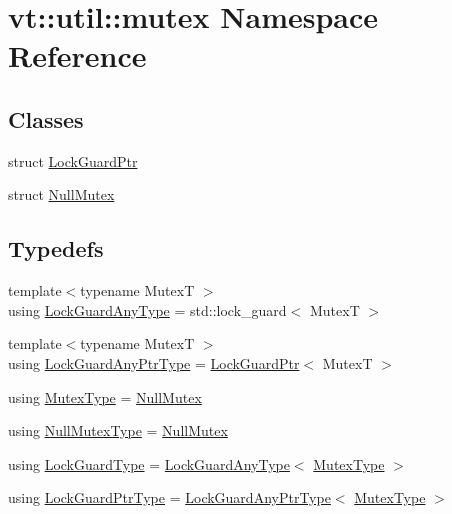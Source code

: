\hypertarget{namespacevt_1_1util_1_1mutex}{}\section{vt\+:\+:util\+:\+:mutex Namespace Reference}
\label{namespacevt_1_1util_1_1mutex}
\subsection*{Classes}
\begin{DoxyCompactItemize}
\item 
struct \hyperlink{structvt_1_1util_1_1mutex_1_1_lock_guard_ptr}{Lock\+Guard\+Ptr}
\item 
struct \hyperlink{structvt_1_1util_1_1mutex_1_1_null_mutex}{Null\+Mutex}
\end{DoxyCompactItemize}
\subsection*{Typedefs}
\begin{DoxyCompactItemize}
\item 
{\footnotesize template$<$typename MutexT $>$ }\\using \hyperlink{namespacevt_1_1util_1_1mutex_ae88ee37c8846b0738a5137f96f912394}{Lock\+Guard\+Any\+Type} = std\+::lock\+\_\+guard$<$ MutexT $>$
\item 
{\footnotesize template$<$typename MutexT $>$ }\\using \hyperlink{namespacevt_1_1util_1_1mutex_ab8d2986992b726eed741bcae3bf9a789}{Lock\+Guard\+Any\+Ptr\+Type} = \hyperlink{structvt_1_1util_1_1mutex_1_1_lock_guard_ptr}{Lock\+Guard\+Ptr}$<$ MutexT $>$
\item 
using \hyperlink{namespacevt_1_1util_1_1mutex_a891571f52e1bcf9eca62d0c2d0862a17}{Mutex\+Type} = \hyperlink{structvt_1_1util_1_1mutex_1_1_null_mutex}{Null\+Mutex}
\item 
using \hyperlink{namespacevt_1_1util_1_1mutex_a92b4648d6c680ec378e4f36ac5af414a}{Null\+Mutex\+Type} = \hyperlink{structvt_1_1util_1_1mutex_1_1_null_mutex}{Null\+Mutex}
\item 
using \hyperlink{namespacevt_1_1util_1_1mutex_a06a2c6944076fefe1b753e8eff4c58bd}{Lock\+Guard\+Type} = \hyperlink{namespacevt_1_1util_1_1mutex_ae88ee37c8846b0738a5137f96f912394}{Lock\+Guard\+Any\+Type}$<$ \hyperlink{namespacevt_1_1util_1_1mutex_a891571f52e1bcf9eca62d0c2d0862a17}{Mutex\+Type} $>$
\item 
using \hyperlink{namespacevt_1_1util_1_1mutex_aca2c02dfb2d46edf4fc867f9ce64d0e5}{Lock\+Guard\+Ptr\+Type} = \hyperlink{namespacevt_1_1util_1_1mutex_ab8d2986992b726eed741bcae3bf9a789}{Lock\+Guard\+Any\+Ptr\+Type}$<$ \hyperlink{namespacevt_1_1util_1_1mutex_a891571f52e1bcf9eca62d0c2d0862a17}{Mutex\+Type} $>$
\end{DoxyCompactItemize}


